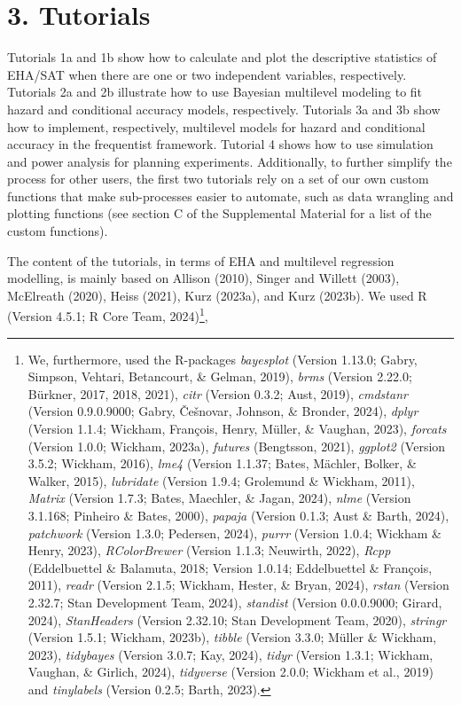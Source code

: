 \documentclass[
  man, donotrepeattitle,floatsintext]{apa6}
\begin{document}
\section{3. Tutorials}\label{tutorials}

Tutorials 1a and 1b show how to calculate and plot the descriptive statistics of EHA/SAT when there are one or two independent variables, respectively. Tutorials 2a and 2b illustrate how to use Bayesian multilevel modeling to fit hazard and conditional accuracy models, respectively. Tutorials 3a and 3b show how to implement, respectively, multilevel models for hazard and conditional accuracy in the frequentist framework. Tutorial 4 shows how to use simulation and power analysis for planning experiments.
Additionally, to further simplify the process for other users, the first two tutorials rely on a set of our own custom functions that make sub-processes easier to automate, such as data wrangling and plotting functions (see section C of the Supplemental Material for a list of the custom functions).

The content of the tutorials, in terms of EHA and multilevel regression modelling, is mainly based on Allison (2010), Singer and Willett (2003), McElreath (2020), Heiss (2021), Kurz (2023a), and Kurz (2023b).
We used R (Version 4.5.1; R Core Team, 2024)\footnote{We, furthermore, used the R-packages \emph{bayesplot} (Version 1.13.0; Gabry, Simpson, Vehtari, Betancourt, \& Gelman, 2019), \emph{brms} (Version 2.22.0; Bürkner, 2017, 2018, 2021), \emph{citr} (Version 0.3.2; Aust, 2019), \emph{cmdstanr} (Version 0.9.0.9000; Gabry, Češnovar, Johnson, \& Bronder, 2024), \emph{dplyr} (Version 1.1.4; Wickham, François, Henry, Müller, \& Vaughan, 2023), \emph{forcats} (Version 1.0.0; Wickham, 2023a), \emph{futures} (Bengtsson, 2021), \emph{ggplot2} (Version 3.5.2; Wickham, 2016), \emph{lme4} (Version 1.1.37; Bates, Mächler, Bolker, \& Walker, 2015), \emph{lubridate} (Version 1.9.4; Grolemund \& Wickham, 2011), \emph{Matrix} (Version 1.7.3; Bates, Maechler, \& Jagan, 2024), \emph{nlme} (Version 3.1.168; Pinheiro \& Bates, 2000), \emph{papaja} (Version 0.1.3; Aust \& Barth, 2024), \emph{patchwork} (Version 1.3.0; Pedersen, 2024), \emph{purrr} (Version 1.0.4; Wickham \& Henry, 2023), \emph{RColorBrewer} (Version 1.1.3; Neuwirth, 2022), \emph{Rcpp} (Eddelbuettel \& Balamuta, 2018; Version 1.0.14; Eddelbuettel \& François, 2011), \emph{readr} (Version 2.1.5; Wickham, Hester, \& Bryan, 2024), \emph{rstan} (Version 2.32.7; Stan Development Team, 2024), \emph{standist} (Version 0.0.0.9000; Girard, 2024), \emph{StanHeaders} (Version 2.32.10; Stan Development Team, 2020), \emph{stringr} (Version 1.5.1; Wickham, 2023b), \emph{tibble} (Version 3.3.0; Müller \& Wickham, 2023), \emph{tidybayes} (Version 3.0.7; Kay, 2024), \emph{tidyr} (Version 1.3.1; Wickham, Vaughan, \& Girlich, 2024), \emph{tidyverse} (Version 2.0.0; Wickham et al., 2019) and \emph{tinylabels} (Version 0.2.5; Barth, 2023).},
\end{document}
